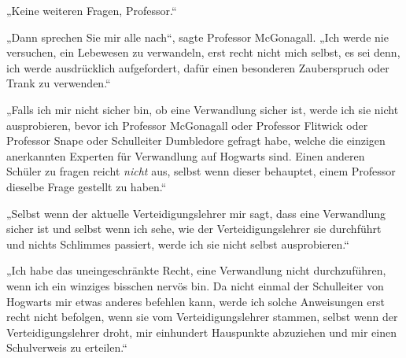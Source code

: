 „Keine weiteren Fragen, Professor.“

„Dann sprechen Sie mir alle nach“, sagte Professor McGonagall. „Ich werde nie versuchen, ein Lebewesen zu verwandeln, erst recht nicht mich selbst, es sei denn, ich werde ausdrücklich aufgefordert, dafür einen besonderen Zauberspruch oder Trank zu verwenden.“

„Falls ich mir nicht sicher bin, ob eine Verwandlung sicher ist, werde ich sie nicht ausprobieren, bevor ich Professor McGonagall oder Professor Flitwick oder Professor Snape oder Schulleiter Dumbledore gefragt habe, welche die einzigen anerkannten Experten für Verwandlung auf Hogwarts sind. Einen anderen Schüler zu fragen reicht \emph{nicht} aus, selbst wenn dieser behauptet, einem Professor dieselbe Frage gestellt zu haben.“

„Selbst wenn der aktuelle Verteidigungslehrer mir sagt, dass eine Verwandlung sicher ist und selbst wenn ich sehe, wie der Verteidigungslehrer sie durchführt und nichts Schlimmes passiert, werde ich sie nicht selbst ausprobieren.“

„Ich habe das uneingeschränkte Recht, eine Verwandlung nicht durchzuführen, wenn ich ein winziges bisschen nervös bin. Da nicht einmal der Schulleiter von Hogwarts mir etwas anderes befehlen kann, werde ich solche Anweisungen erst recht nicht befolgen, wenn sie vom Verteidigungslehrer stammen, selbst wenn der Verteidigungslehrer droht, mir einhundert Hauspunkte abzuziehen und mir einen Schulverweis zu erteilen.“

